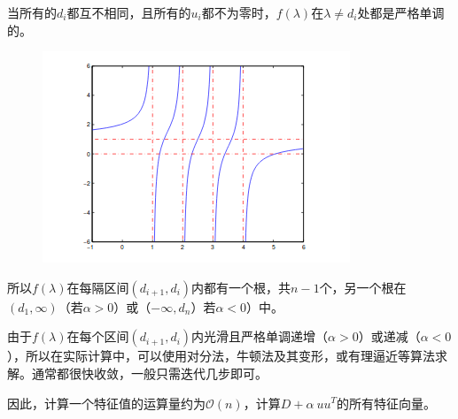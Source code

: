 \documentclass[12pt,a4paper]{article}
\begin{document}
当所有的$d_i$都互不相同，且所有的$u_i$都不为零时，$f(\lambda)$在$\lambda \neq d_i$处都是严格单调的。
\begin{figure}[H]
	\centering
	\includegraphics[scale=1]{figurest/figure_2.png}
\end{figure}
所以$f(\lambda)$在每隔区间$(d_{i+1},d_i)$内都有一个根，共$n-1$个，另一个根在$(d_1,\infty)$（若$\alpha >0$）或（$-\infty,d_n$）若$\alpha <0$）中。

由于$f(\lambda)$在每个区间$(d_{i+1},d_i)$内光滑且严格单调递增（$\alpha >0$）或递减（$\alpha <0$），所以在实际计算中，可以使用对分法，牛顿法及其变形，或有理逼近等算法求解。通常都很快收敛，一般只需迭代几步即可。

因此，计算一个特征值的运算量约为$\mathcal{O}(n)$，计算$D+\alpha\ uu^T$的所有特征向量。
\end{document}

